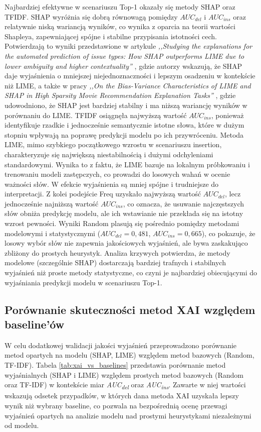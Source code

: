 \documentclass[wmii, inf, mgr]{uwmthesis}
\begin{document}
Najbardziej efektywne w scenariuszu Top-1 okazały się metody SHAP oraz TFIDF. SHAP wyróżnia się dobrą równowagą pomiędzy $AUC_{del}$ i $AUC_{ins}$ oraz relatywnie niską wariancją wyników, co wynika z oparcia na teorii wartości Shapleya, zapewniającej spójne i stabilne przypisania istotności cech. Potwierdzają to wyniki przedstawione w artykule \textit{,,Studying the explanations for the automated prediction of issue types: How SHAP outperforms LIME due to lower ambiguity and higher contextuality''} \cite{schulte2024}, gdzie autorzy wskazują, że SHAP daje wyjaśnienia o mniejszej niejednoznaczności i lepszym osadzeniu w kontekście niż LIME, a także w pracy \textit{,,On the Bias-Variance Characteristics of LIME and SHAP in High Sparsity Movie Recommendation Explanation Tasks''} \cite{roberts2022}, gdzie udowodniono, że SHAP jest bardziej stabilny i ma niższą wariancję wyników w porównaniu do LIME. TFIDF osiągnęła najwyższą wartość $AUC_{ins}$, ponieważ identyfikuje rzadkie i jednocześnie semantycznie istotne słowa, które w dużym stopniu wpływają na poprawę predykcji modelu po ich przywróceniu. Metoda LIME, mimo szybkiego początkowego wzrostu w scenariuszu insertion, charakteryzuje się największą niestabilnością i dużymi odchyleniami standardowymi. Wynika to z faktu, że LIME bazuje na lokalnym próbkowaniu i trenowaniu modeli zastępczych, co prowadzi do losowych wahań w ocenie ważności słów. W efekcie wyjaśnienia są mniej spójne i trudniejsze do interpretacji. Z kolei podejście Freq uzyskało najwyższą wartość $AUC_{del}$, lecz jednocześnie najniższą wartość $AUC_{ins}$, co oznacza, że usuwanie najczęstszych słów obniża predykcję modelu, ale ich wstawianie nie przekłada się na istotny wzrost pewności. Wyniki Random plasują się pośrednio pomiędzy metodami modelowymi i statystycznymi ($AUC_{del} = 0{,}481$, $AUC_{ins} = 0{,}665$), co pokazuje, że losowy wybór słów nie zapewnia jakościowych wyjaśnień, ale bywa zaskakująco zbliżony do prostych heurystyk. Analiza krzywych potwierdza, że metody modelowe (szczególnie SHAP) dostarczają bardziej trafnych i stabilnych wyjaśnień niż proste metody statystyczne, co czyni je najbardziej obiecującymi do wyjaśniania predykcji modelu w scenariuszu Top-1.


\subsection{Porównanie skuteczności metod XAI względem baseline’ów}
W celu dodatkowej walidacji jakości wyjaśnień przeprowadzono porównanie metod opartych na modelu (SHAP, LIME) względem metod bazowych (Random, TF-IDF). Tabela \ref{tab:xai_vs_baselines} przedstawia porównanie metod wyjaśnialnych (SHAP i LIME) względem prostych metod bazowych (Random oraz TF-IDF) w kontekście miar \textit{AUC\textsubscript{del}} oraz \textit{AUC\textsubscript{ins}}. Zawarte w niej wartości wskazują odsetek przypadków, w których dana metoda XAI uzyskała lepszy wynik niż wybrany baseline, co pozwala na bezpośrednią ocenę przewagi wyjaśnień opartych na analizie modelu nad prostymi heurystykami niezależnymi od modelu.
\end{document}

